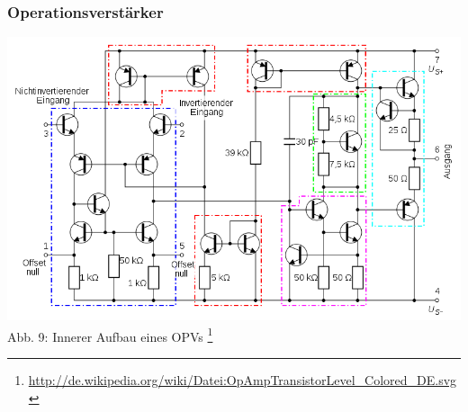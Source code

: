 \begin{frame}
\frametitle{Operationsverstärker}
\begin{center}
	\includegraphics[scale=0.35]{e13/OPV-intern.png}\\
	Abb. 9: Innerer Aufbau eines OPVs
	\footnote{\url{http://de.wikipedia.org/wiki/Datei:OpAmpTransistorLevel_Colored_DE.svg}}
\end{center}
\end{frame}


